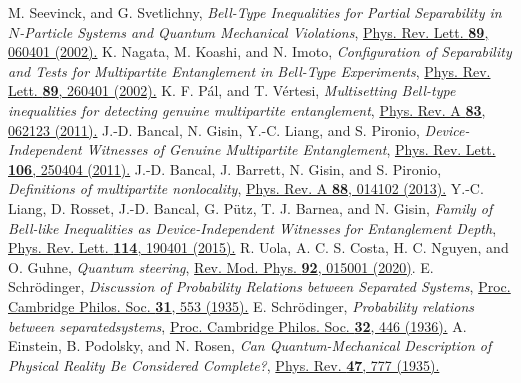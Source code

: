 \documentclass[pra,a4paper,aps,twocolumn,showpacs,superscriptaddress,groupedaddress]{revtex4}
\begin{document}
\begin{thebibliography}{1}
 M. Seevinck, and G. Svetlichny, \emph{Bell-Type Inequalities for Partial Separability in $N$-Particle Systems and Quantum Mechanical Violations}, \href{https://journals.aps.org/prl/abstract/10.1103/PhysRevLett.89.060401}{Phys. Rev. Lett. \textbf{89}, 060401 (2002).}
 K. Nagata, M. Koashi, and N. Imoto, \emph{Configuration of Separability and Tests for Multipartite Entanglement in Bell-Type Experiments}, \href{https://journals.aps.org/prl/abstract/10.1103/PhysRevLett.89.260401}{Phys. Rev. Lett. \textbf{89}, 260401 (2002).}
 K. F. P\'{a}l, and T. V\'{e}rtesi, \emph{Multisetting Bell-type inequalities for detecting genuine multipartite entanglement}, \href{https://journals.aps.org/pra/abstract/10.1103/PhysRevA.83.062123}{Phys. Rev. A \textbf{83}, 062123 (2011).}
 J.-D. Bancal, N. Gisin, Y.-C. Liang, and S. Pironio, \emph{Device-Independent Witnesses of Genuine Multipartite Entanglement}, \href{https://journals.aps.org/prl/abstract/10.1103/PhysRevLett.106.250404}{Phys. Rev. Lett. \textbf{106}, 250404 (2011).}
 J.-D. Bancal, J. Barrett, N. Gisin, and S. Pironio, \emph{Definitions of multipartite nonlocality}, \href{https://journals.aps.org/pra/abstract/10.1103/PhysRevA.88.014102}{ Phys. Rev. A {\bf 88}, 014102 (2013).}
 Y.-C. Liang, D. Rosset, J.-D. Bancal, G. P\"{u}tz, T. J. Barnea, and N. Gisin, \emph{Family of Bell-like Inequalities as Device-Independent Witnesses for Entanglement Depth}, \href{https://journals.aps.org/prl/abstract/10.1103/PhysRevLett.114.190401}{Phys. Rev. Lett. \textbf{114}, 190401 (2015).}
 R. Uola, A. C. S. Costa, H. C. Nguyen, and O. Guhne, \emph{Quantum steering}, \href{https://journals.aps.org/rmp/abstract/10.1103/RevModPhys.92.015001}{Rev. Mod. Phys. {\bf 92}, 015001 (2020)}.
 E. Schr\"{o}dinger, \emph{Discussion of Probability Relations between Separated Systems}, \href{https://www.cambridge.org/core/journals/mathematical-proceedings-of-the-cambridge-philosophical-society/article/discussion-of-probability-relations-between-separated-systems/C1C71E1AA5BA56EBE6588AAACB9A222D}{ Proc. Cambridge Philos. Soc. {\bf 31}, 553 (1935).}
 E. Schr\"{o}dinger, \emph{Probability relations between separatedsystems}, \href{https://www.cambridge.org/core/journals/mathematical-proceedings-of-the-cambridge-philosophical-society/article/probability-relations-between-separated-systems/641DDDED6FB033A1B190B458E0D02F22}{ Proc. Cambridge Philos. Soc. {\bf 32}, 446 (1936).}
 A. Einstein, B. Podolsky, and N. Rosen,  \emph{Can Quantum-Mechanical Description of Physical Reality Be Considered Complete?}, \href{https://journals.aps.org/pr/abstract/10.1103/PhysRev.47.777}{Phys. Rev. {\bf 47}, 777 (1935).}

\end{thebibliography}
\end{document}
